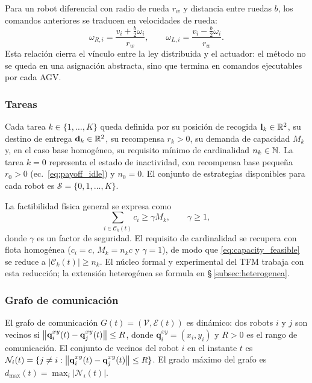 Para un robot diferencial con radio de rueda $r_w$ y distancia entre ruedas $b$, los
comandos anteriores se traducen en velocidades de rueda:
\begin{equation}
  \omega_{R,i} = \frac{v_i + \frac{b}{2}\omega_i}{r_w}, \qquad
  \omega_{L,i} = \frac{v_i - \frac{b}{2}\omega_i}{r_w}.
  \label{eq:wheel_speeds}
\end{equation}
Esta relación cierra el vínculo entre la ley distribuida y el actuador: el método no se
queda en una asignación abstracta, sino que termina en comandos ejecutables por cada AGV.



\subsubsection{Tareas}

Cada tarea $k \in \{1, \ldots, K\}$ queda definida por su posición de recogida
$\mathbf{l}_k \in \mathbb{R}^2$, su destino de entrega $\mathbf{d}_k \in \mathbb{R}^2$,
su recompensa $r_k > 0$, su demanda de capacidad $M_k$ y, en el caso base homogéneo,
su requisito mínimo de cardinalidad $n_k \in \mathbb{N}$. La tarea $k = 0$ representa el
estado de inactividad, con recompensa base pequeña $r_0 > 0$
(ec.~\eqref{eq:payoff_idle}) y $n_0 = 0$. El conjunto de estrategias disponibles para
cada robot es $\mathcal{S} = \{0, 1, \ldots, K\}$.

La factibilidad física general se expresa como
\begin{equation}
  \sum_{i\in\mathcal{C}_k(t)} c_i \geq \gamma M_k,\qquad \gamma \geq 1,
  \label{eq:capacity_feasible}
\end{equation}
donde $\gamma$ es un factor de seguridad. El requisito de cardinalidad se recupera con
flota homogénea ($c_i = c$, $M_k = n_kc$ y $\gamma=1$), de modo que
\eqref{eq:capacity_feasible} se reduce a $|\mathcal{C}_k(t)| \geq n_k$. El núcleo
formal y experimental del TFM trabaja con esta reducción; la extensión heterogénea se
formula en \S\,\ref{subsec:heterogenea}.

\subsubsection{Grafo de comunicación}

El grafo de comunicación $G(t) = (\mathcal{V}, \mathcal{E}(t))$ es dinámico:
dos robots $i$ y $j$ son vecinos si $\left\|\mathbf{q}_i^{xy}(t) - \mathbf{q}_j^{xy}(t)\right\|
\leq R$, donde $\mathbf{q}_i^{xy} = (x_i, y_i)$ y $R > 0$ es el rango de
comunicación. El conjunto de vecinos del robot $i$ en el instante $t$ es
$\mathcal{N}_i(t) = \{j \neq i : \left\|\mathbf{q}_i^{xy}(t) - \mathbf{q}_j^{xy}(t)\right\| \leq R\}$.
El grado máximo del grafo es $d_{\max}(t) = \max_i |\mathcal{N}_i(t)|$.

